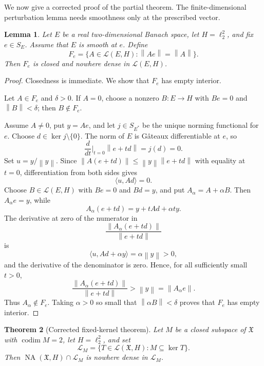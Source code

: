 \documentclass[11pt]{article}
\newtheorem{theorem}{Theorem}[section]
\newtheorem{lemma}[theorem]{Lemma}
\theoremstyle{definition}
\newcommand{\NA}{\operatorname{NA}}
\newcommand{\calL}{\mathcal L}
\newcommand{\codim}{\operatorname{codim}}
\newcommand{\X}{\mathfrak X}
\newcommand{\norm}[1]{\left\lVert #1\right\rVert}
\begin{document}
We now give a corrected proof of the partial theorem.  The finite-dimensional
perturbation lemma needs smoothness only at the prescribed vector.

\begin{lemma}\label{lem:Fe}
Let \(E\) be a real two-dimensional Banach space, let \(H=\ell_2^2\), and
fix \(e\in S_E\).  Assume that \(E\) is smooth at \(e\).  Define
\[
        F_e=\{A\in\calL(E,H):\norm{Ae}=\norm{A}\}.
\]
Then \(F_e\) is closed and nowhere dense in \(\calL(E,H)\).
\end{lemma}

\begin{proof}
Closedness is immediate.  We show that \(F_e\) has empty interior.

Let \(A\in F_e\) and \(\delta>0\).  If \(A=0\), choose a nonzero
\(B:E\to H\) with \(Be=0\) and \(\norm{B}<\delta\); then \(B\notin F_e\).

Assume \(A\neq0\), put \(y=Ae\), and let \(j\in S_{E^*}\) be the unique
norming functional for \(e\).  Choose \(d\in\ker j\setminus\{0\}\).  The
norm of \(E\) is G\^ateaux differentiable at \(e\), so
\[
       \frac{d}{dt}\bigg|_{t=0}\norm{e+td}=j(d)=0.
\]
Set \(u=y/\norm{y}\).  Since \(\norm{A(e+td)}\leq
\norm{y}\norm{e+td}\) with equality at \(t=0\), differentiation from both
sides gives
\[
                     \langle u,Ad\rangle=0.
\]
Choose \(B\in\calL(E,H)\) with \(Be=0\) and \(Bd=y\), and put
\(A_\alpha=A+\alpha B\).  Then \(A_\alpha e=y\), while
\[
       A_\alpha(e+td)=y+tAd+\alpha t y.
\]
The derivative at zero of the numerator in
\[
       \frac{\norm{A_\alpha(e+td)}}{\norm{e+td}}
\]
is
\[
       \langle u,Ad+\alpha y\rangle=\alpha\norm{y}>0,
\]
and the derivative of the denominator is zero.  Hence, for all sufficiently
small \(t>0\),
\[
       \frac{\norm{A_\alpha(e+td)}}{\norm{e+td}}
       >\norm{y}=\norm{A_\alpha e}.
\]
Thus \(A_\alpha\notin F_e\).  Taking \(\alpha>0\) so small that
\(\norm{\alpha B}<\delta\) proves that \(F_e\) has empty interior.
\end{proof}

\begin{theorem}[Corrected fixed-kernel theorem]\label{thm:fixed-kernel}
Let \(M\) be a closed subspace of \(\X\) with \(\codim M=2\), let
\(H=\ell_2^2\), and set
\[
       \calL_M=\{T\in\calL(\X,H):M\subseteq\ker T\}.
\]
Then \(\NA(\X,H)\cap\calL_M\) is nowhere dense in \(\calL_M\).
\end{theorem}
\end{document}
